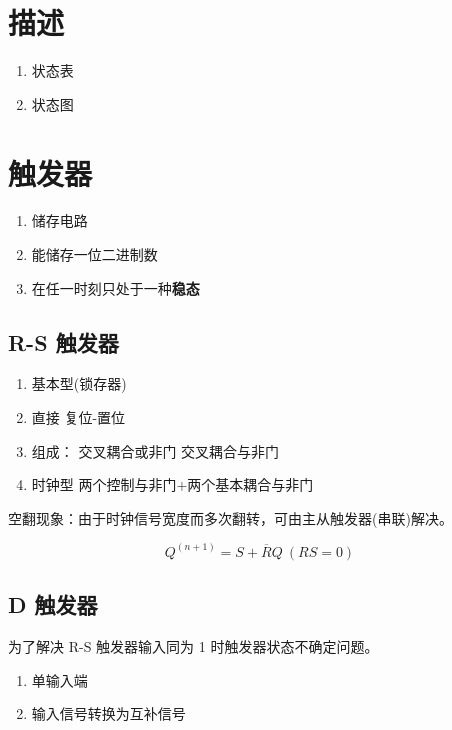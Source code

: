 \section{描述}

\begin{enumerate}
    \item 状态表
    \item 状态图
\end{enumerate}

\newpage

\section{触发器}

\begin{enumerate}
    \item 储存电路
    \item 能储存一位二进制数
    \item 在任一时刻只处于一种\textbf{稳态}
\end{enumerate}

\subsection{R-S 触发器}

\begin{enumerate}
    \item 基本型(锁存器)
    \item 直接 复位-置位
    \item 组成：
          交叉耦合或非门
          交叉耦合与非门
    \item 时钟型
          两个控制与非门+两个基本耦合与非门
\end{enumerate}

空翻现象：由于时钟信号宽度而多次翻转，可由主从触发器(串联)解决。

\begin{equation}
    Q^{(n+1)}=S+\overline{R}Q~(RS=0)
\end{equation}

\newpage

\subsection{D 触发器}

为了解决 R-S 触发器输入同为 1 时触发器状态不确定问题。

\begin{enumerate}
    \item 单输入端
    \item 输入信号转换为互补信号
\end{enumerate}

